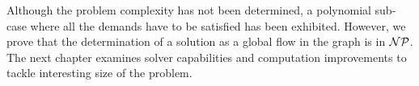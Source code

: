 \medskip
Although the problem complexity has not been determined, a polynomial sub-case where all the demands have to be satisfied has been exhibited.
However, we prove that the determination of a solution as a global flow in the graph is in {$\cal NP$}.
The next chapter examines solver capabilities and computation improvements to tackle interesting size of the problem.









\newpage
{}
\renewcommand{\bibname}{Bibliography of chapter \thechapter}



